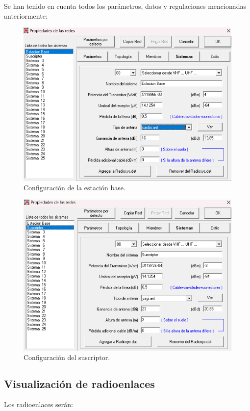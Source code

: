 \documentclass{article}
\begin{document}
Se han tenido en cuenta todos los parámetros, datos y regulaciones mencionadas anteriormente:

\begin{figure}[ht]
    \centering
    \includegraphics[width=0.7\linewidth]{src/estacionbase.png}
    \caption{\label{fig:ebaseconfig} Configuración de la estación base.}
\end{figure}

\begin{figure}[ht]
    \centering
    \includegraphics[width=0.7\linewidth]{src/suscriptor.png}
    \caption{\label{fig:suscripconfig} Configuración del suscriptor.}
\end{figure}

\newpage

\subsection{Visualización de radioenlaces}

Los radioenlaces serán:
\end{document}
